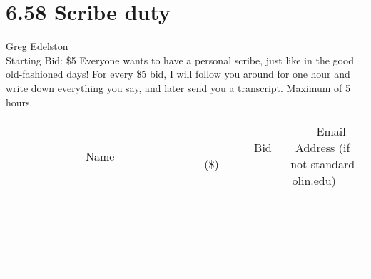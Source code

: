 \documentclass[11pt]{article}
\begin{document}
\section*{6.58 Scribe duty}
Greg Edelston
\\
Starting Bid: \$5
\newline
Everyone wants to have a personal scribe, just like in the good old-fashioned days! For every \$5 bid, I will follow you around for one hour and write down everything you say, and later send you a transcript. Maximum of 5 hours.
\\[3ex]
\begin{tabular}{c c c}
~~~~~~~~~~~~~Name~~~~~~~~~~~~~ & ~~~~~~~~~Bid (\$)~~~~~~~~~  & ~~~Email Address (if not standard olin.edu)~~~\\
 & & \\
\hline
 & & \\
\hline
 & & \\
\hline
 & & \\
\hline
 & & \\
\hline
 & & \\
\hline
 & & \\
\hline
 & & \\
\hline
 & & \\
\hline
 & & \\
\hline
 & & \\
\hline
 & & \\
\hline
 & & \\
\hline
 & & \\
\hline
 & & \\
\hline
 & & \\
\hline
 & & \\
\hline
 & & \\
\hline
 & & \\
\hline
\end{tabular}
\newpage
\end{document}

